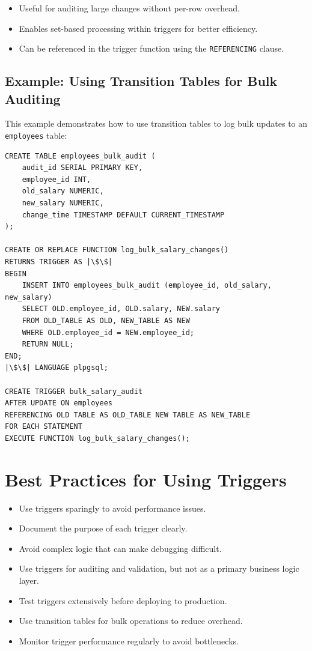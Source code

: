 \documentclass{article}
\begin{document}
\begin{itemize}
    \item Useful for auditing large changes without per-row overhead.
    \item Enables set-based processing within triggers for better efficiency.
    \item Can be referenced in the trigger function using the \texttt{REFERENCING} clause.
\end{itemize}

\subsection*{Example: Using Transition Tables for Bulk Auditing}

This example demonstrates how to use transition tables to log bulk updates to an \texttt{employees} table:

\begin{verbatim}
CREATE TABLE employees_bulk_audit (
    audit_id SERIAL PRIMARY KEY,
    employee_id INT,
    old_salary NUMERIC,
    new_salary NUMERIC,
    change_time TIMESTAMP DEFAULT CURRENT_TIMESTAMP
);

CREATE OR REPLACE FUNCTION log_bulk_salary_changes()
RETURNS TRIGGER AS |\$\$|
BEGIN
    INSERT INTO employees_bulk_audit (employee_id, old_salary, new_salary)
    SELECT OLD.employee_id, OLD.salary, NEW.salary
    FROM OLD_TABLE AS OLD, NEW_TABLE AS NEW
    WHERE OLD.employee_id = NEW.employee_id;
    RETURN NULL;
END;
|\$\$| LANGUAGE plpgsql;

CREATE TRIGGER bulk_salary_audit
AFTER UPDATE ON employees
REFERENCING OLD TABLE AS OLD_TABLE NEW TABLE AS NEW_TABLE
FOR EACH STATEMENT
EXECUTE FUNCTION log_bulk_salary_changes();
\end{verbatim}

\section{Best Practices for Using Triggers}
\begin{itemize}
    \item Use triggers sparingly to avoid performance issues.
    \item Document the purpose of each trigger clearly.
    \item Avoid complex logic that can make debugging difficult.
    \item Use triggers for auditing and validation, but not as a primary business logic layer.
    \item Test triggers extensively before deploying to production.
    \item Use transition tables for bulk operations to reduce overhead.
    \item Monitor trigger performance regularly to avoid bottlenecks.
\end{itemize}
\end{document}
